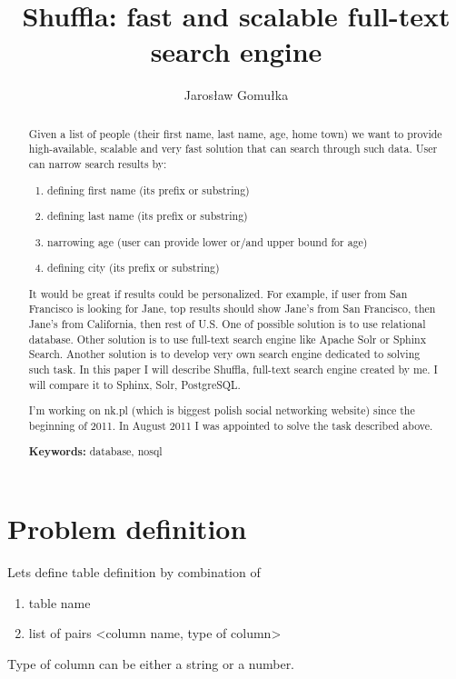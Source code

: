 \documentclass[10pt,a4paper]{article}
\begin{document}
\title{Shuffla: fast and scalable full-text search engine}
\author{Jarosław Gomułka}

\maketitle

\begin{abstract}
Given a list of people (their first name, last name, age, home town) we want to provide high-available, scalable and very fast solution that can search through such data.
User can narrow search results by:

\bigskip
\begin{enumerate}
\item{defining first name (its prefix or substring)}
\item{defining last name (its prefix or substring)}
\item{narrowing age (user can provide lower or/and upper bound for age)}
\item{defining city (its prefix or substring)}
\end{enumerate}

\bigskip
It would be great if results could be personalized. For example, if user from San Francisco is looking for Jane, top results should show Jane's from San Francisco, then Jane's from California, then rest of U.S. One of possible solution is to use relational database. Other solution is to use full-text search engine like Apache Solr or Sphinx Search. Another solution is to develop very own search engine dedicated to solving such task. In this paper I will describe Shuffla, full-text search engine created by me. I will compare it to Sphinx, Solr, PostgreSQL. 

\bigskip
I'm working on nk.pl (which is biggest polish social networking website) since the beginning of 2011. In August 2011 I was appointed to solve the task described above. 

\bigskip
\noindent \textbf{Keywords:} database, nosql
\end{abstract}


\section{Problem definition}

Lets define table definition by combination of
\begin{enumerate}
\item table name
\item list of pairs <column name, type of column>
\end{enumerate}
Type of column can be either a string or a number.
\end{document}
